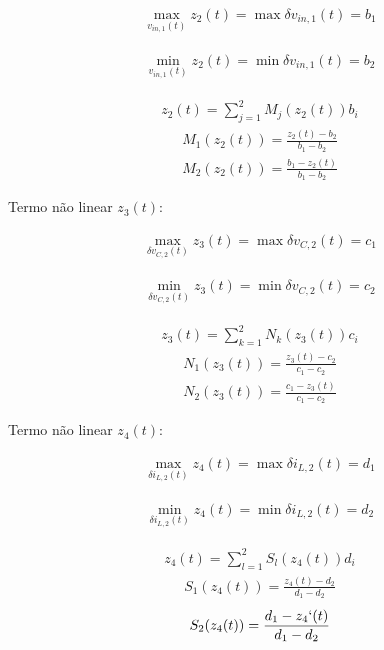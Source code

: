 \begin{gather*}
  \max_{ v_{in,1}(t)} z_2(t) = \max \delta v_{in,1}(t) = b_1
\end{gather*}

\begin{gather}
  \min_{ v_{in,1}(t)} z_2(t) = \min \delta v_{in,1}(t) = b_2
\end{gather}

\begin{gather*}
  z_2(t) = \sum\limits_{j=1}^{2} M_j(z_2(t))b_i
\end{gather*}
\begin{gather}
  M_1(z_2(t)) = \frac{z_2(t) - b_2}{b_1 - b_2}
\end{gather}
\begin{gather}
  M_2(z_2(t)) = \frac{b_1 - z_2(t)}{b_1 - b_2}
\end{gather}

Termo não linear $z_3(t)$:

\begin{gather*}
  \max_{\delta v_{C,2}(t)} z_3(t) = \max \delta v_{C,2}(t) = c_1
\end{gather*}

\begin{gather}
  \min_{\delta v_{C,2}(t)} z_3(t) = \min \delta v_{C,2}(t) = c_2
\end{gather}

\begin{gather*}
  z_3(t) = \sum\limits_{k=1}^{2} N_k(z_3(t))c_i
\end{gather*}
\begin{gather}
  N_1(z_3(t)) = \frac{z_3(t) - c_2}{c_1 - c_2}
\end{gather}
\begin{gather}
  N_2(z_3(t)) = \frac{c_1 - z_3(t)}{c_1 - c_2}
\end{gather}

Termo não linear $z_4(t)$:

\begin{gather*}
  \max_{\delta i_{L,2}(t)} z_4(t) = \max \delta i_{L,2}(t) = d_1
\end{gather*}

\begin{gather}
  \min_{\delta i_{L,2}(t)} z_4(t) = \min \delta i_{L,2}(t) = d_2
\end{gather}

\begin{gather*}
  z_4(t) = \sum\limits_{l=1}^{2} S_l(z_4(t))d_i
\end{gather*}
\begin{gather}
  S_1(z_4(t)) = \frac{z_4(t) - d_2}{d_1 - d_2}
\end{gather}
\begin{gather}
  S_2(z_4(t)) = \frac{d_1 - z_4`(t)}{d_1 - d_2}
\end{gather}

